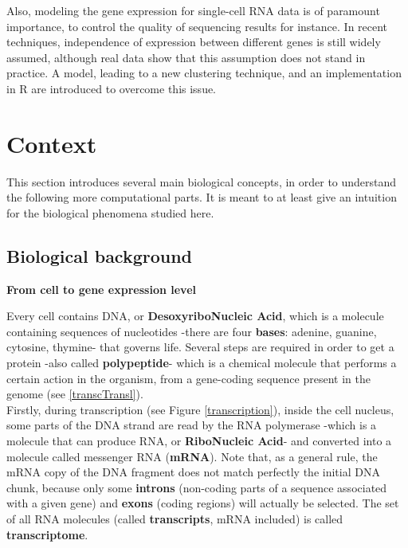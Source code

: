 \documentclass{report}
\begin{document}
Also, modeling the gene expression for single-cell RNA data is of paramount importance, to control the quality of sequencing results for instance. In recent techniques, independence of expression between different genes is still widely assumed, although real data show that this assumption does not stand in practice. A model, leading to a new clustering technique, and an implementation in R are introduced to overcome this issue.

\newpage
 
\tableofcontents
 
\newpage

\listoffigures

\newpage

\listoftables

\newpage
 

\xpatchcmd{\chapter}{
  \thispagestyle{plain}
}{
  \pagestyle{mystyle}
}{}{}

\chapter{Context}

This section introduces several main biological concepts, in order to understand the following more computational parts. It is meant to at least give an intuition for the biological phenomena studied here.

\section{Biological background}

\textbf{From cell to gene expression level}
\bigskip

Every cell contains DNA, or \textbf{DesoxyriboNucleic Acid}, which is a molecule containing sequences of nucleotides\cite{watson2004molecular} -there are four \textbf{bases}: adenine, guanine, cytosine, thymine- that governs life. Several steps are required in order to get a protein -also called \textbf{polypeptide}- which is a chemical molecule that performs a certain action in the organism, from a gene-coding sequence present in the genome (see \ref{transcTransl}).\\

Firstly, during transcription (see Figure \ref{transcription}), inside the cell nucleus, some parts of the DNA strand are read by the RNA polymerase -which is a molecule that can produce RNA, or \textbf{RiboNucleic Acid}- and converted into a molecule called messenger RNA (\textbf{mRNA})\cite{brenner1961unstable}. Note that, as a general rule, the mRNA copy of the DNA fragment does not match perfectly the initial DNA chunk, because only some \textbf{introns} (non-coding parts of a sequence associated with a given gene) and \textbf{exons} (coding regions) will actually be selected. The set of all RNA molecules (called \textbf{transcripts}, mRNA included) is called \textbf{transcriptome}.\\
\end{document}
